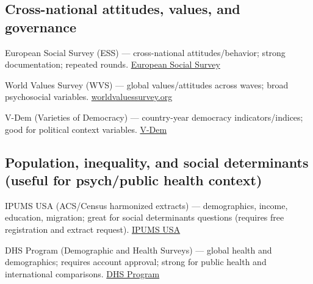 \documentclass[
  11pt,
]{article}
\begin{document}
\subsection{Cross-national attitudes, values, and
governance}\label{cross-national-attitudes-values-and-governance}

European Social Survey (ESS) --- cross-national attitudes/behavior;
strong documentation; repeated rounds.
\href{https://www.europeansocialsurvey.org/data-portal}{European Social
Survey}

World Values Survey (WVS) --- global values/attitudes across waves;
broad psychosocial variables.
\href{https://www.worldvaluessurvey.org/WVSContents.jsp}{worldvaluessurvey.org}

V-Dem (Varieties of Democracy) --- country-year democracy
indicators/indices; good for political context variables.
\href{https://v-dem.net/data/the-v-dem-dataset/}{V-Dem}

\subsection{Population, inequality, and social determinants (useful for
psych/public health
context)}\label{population-inequality-and-social-determinants-useful-for-psychpublic-health-context}

IPUMS USA (ACS/Census harmonized extracts) --- demographics, income,
education, migration; great for social determinants questions (requires
free registration and extract request).
\href{https://usa.ipums.org/usa/data.shtml}{IPUMS USA}

DHS Program (Demographic and Health Surveys) --- global health and
demographics; requires account approval; strong for public health and
international comparisons. \href{https://www.dhsprogram.com/data/}{DHS
Program}
\end{document}
